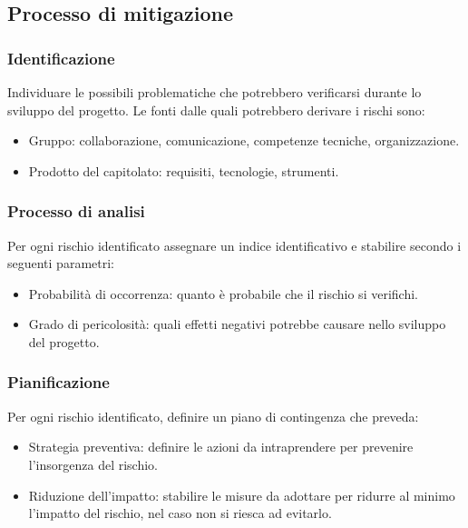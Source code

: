 \documentclass{article}
\begin{document}
\subsection{Processo di mitigazione}
\subsubsection{Identificazione}
Individuare le possibili problematiche che potrebbero verificarsi durante lo sviluppo del progetto. 
Le fonti dalle quali potrebbero derivare i rischi sono: 
\begin{itemize}
    \item Gruppo: collaborazione, comunicazione, competenze tecniche, organizzazione.
    \item Prodotto del capitolato: requisiti, tecnologie, strumenti.
\end{itemize}

\subsubsection{Processo di analisi}
Per ogni rischio identificato assegnare un indice identificativo e stabilire secondo i seguenti parametri:
\begin{itemize}
    \item Probabilità di occorrenza: quanto è probabile che il rischio si verifichi.
    \item Grado di pericolosità: quali effetti negativi potrebbe causare nello sviluppo del progetto.
\end{itemize}

\subsubsection{Pianificazione}
Per ogni rischio identificato, definire un piano di contingenza che preveda:
\begin{itemize}
    \item Strategia preventiva: definire le azioni da intraprendere per prevenire l’insorgenza del rischio.
    \item Riduzione dell'impatto: stabilire le misure da adottare per ridurre al minimo l'impatto del rischio, nel caso non si riesca ad evitarlo.
\end{itemize}
\end{document}

